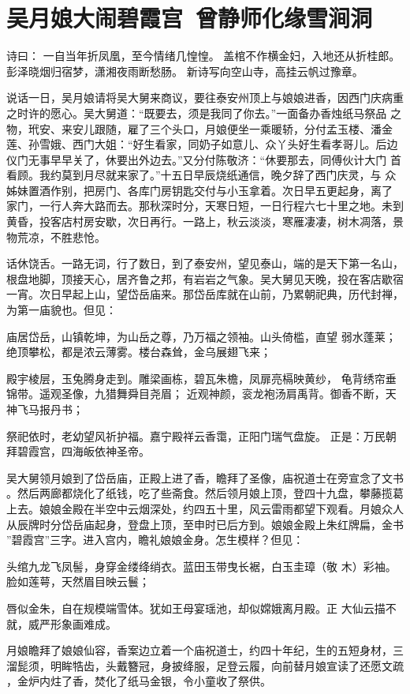 \chapter{吴月娘大闹碧霞宫~曾静师化缘雪涧洞}

诗曰：
一自当年折凤凰，至今情绪几惶惶。
盖棺不作横金妇，入地还从折桂郎。
彭泽晓烟归宿梦，潇湘夜雨断愁肠。
新诗写向空山寺，高挂云帆过豫章。

说话一日，吴月娘请将吴大舅来商议，要往泰安州顶上与娘娘进香，因西门庆病重
之时许的愿心。吴大舅道：“既要去，须是我同了你去。”一面备办香烛纸马祭品
之物，玳安、来安儿跟随，雇了三个头口，月娘便坐一乘暖轿，分付孟玉楼、潘金
莲、孙雪娥、西门大姐：“好生看家，同奶子如意儿、众丫头好生看孝哥儿。后边
仪门无事早早关了，休要出外边去。”又分付陈敬济：“休要那去，同傅伙计大门
首看顾。我约莫到月尽就来家了。”十五日早辰烧纸通信，晚夕辞了西门庆灵，与
众姊妹置酒作别，把房门、各库门房钥匙交付与小玉拿着。次日早五更起身，离了
家门，一行人奔大路而去。那秋深时分，天寒日短，一日行程六七十里之地。未到
黄昏，投客店村房安歇，次日再行。一路上，秋云淡淡，寒雁凄凄，树木凋落，景
物荒凉，不胜悲怆。

话休饶舌。一路无词，行了数日，到了泰安州，望见泰山，端的是天下第一名山，
根盘地脚，顶接天心，居齐鲁之邦，有岩岩之气象。吴大舅见天晚，投在客店歇宿
一宵。次日早起上山，望岱岳庙来。那岱岳库就在山前，乃累朝祀典，历代封禅，
为第一庙貌也。但见：

庙居岱岳，山镇乾坤，为山岳之尊，乃万福之领袖。山头倚槛，直望
弱水蓬莱；
绝顶攀松，都是浓云薄雾。楼台森耸，金乌展翅飞来；

殿宇棱层，玉兔腾身走到。雕梁画栋，碧瓦朱檐，凤扉亮槅映黄纱，
龟背绣帘垂锦带。遥观圣像，九猎舞舜目尧眉；
近观神颜，衮龙袍汤肩禹背。御香不断，天神飞马报丹书；

祭祀依时，老幼望风祈护福。嘉宁殿祥云香霭，正阳门瑞气盘旋。
正是：万民朝拜碧霞宫，四海皈依神圣帝。

吴大舅领月娘到了岱岳庙，正殿上进了香，瞻拜了圣像，庙祝道士在旁宣念了文书
。然后两廊都烧化了纸钱，吃了些斋食。然后领月娘上顶，登四十九盘，攀藤揽葛
上去。娘娘金殿在半空中云烟深处，约四五十里，风云雷雨都望下观看。月娘众人
从辰牌时分岱岳庙起身，登盘上顶，至申时已后方到。娘娘金殿上朱红牌扁，金书
”碧霞宫”三字。进入宫内，瞻礼娘娘金身。怎生模样？但见：

头绾九龙飞凤髻，身穿金缕绛绡衣。蓝田玉带曳长裾，白玉圭璋（敬
木）彩袖。脸如莲萼，天然眉目映云鬟；

唇似金朱，自在规模端雪体。犹如王母宴瑶池，却似嫦娥离月殿。正
大仙云描不就，威严形象画难成。

月娘瞻拜了娘娘仙容，香案边立着一个庙祝道士，约四十年纪，生的五短身材，三
溜髭须，明眸牿齿，头戴簪冠，身披绛服，足登云履，向前替月娘宣读了还愿文疏
，金炉内炷了香，焚化了纸马金银，令小童收了祭供。

